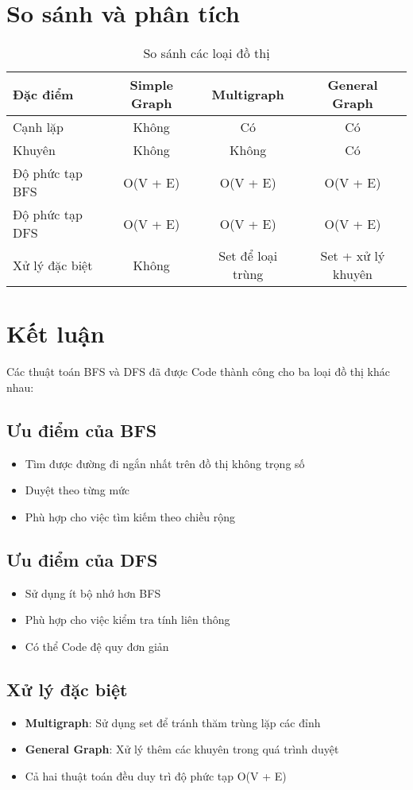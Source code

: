 \documentclass[12pt]{article}
\begin{document}
\section{So sánh và phân tích}

\begin{table}[h!]
\centering
\begin{tabular}{|l|c|c|c|}
\hline
\textbf{Đặc điểm} & \textbf{Simple Graph} & \textbf{Multigraph} & \textbf{General Graph} \\
\hline
Cạnh lặp & Không & Có & Có \\
\hline
Khuyên & Không & Không & Có \\
\hline
Độ phức tạp BFS & O(V + E) & O(V + E) & O(V + E) \\
\hline
Độ phức tạp DFS & O(V + E) & O(V + E) & O(V + E) \\
\hline
Xử lý đặc biệt & Không & Set để loại trùng & Set + xử lý khuyên \\
\hline
\end{tabular}
\caption{So sánh các loại đồ thị}
\end{table}
\section{Kết luận}
Các thuật toán BFS và DFS đã được Code thành công cho ba loại đồ thị khác nhau:
\subsection{Ưu điểm của BFS}
\begin{itemize}
\item Tìm được đường đi ngắn nhất trên đồ thị không trọng số
\item Duyệt theo từng mức
\item Phù hợp cho việc tìm kiếm theo chiều rộng
\end{itemize}
\subsection{Ưu điểm của DFS}
\begin{itemize}
\item Sử dụng ít bộ nhớ hơn BFS
\item Phù hợp cho việc kiểm tra tính liên thông
\item Có thể Code đệ quy đơn giản
\end{itemize}
\subsection{Xử lý đặc biệt}
\begin{itemize}
\item \textbf{Multigraph}: Sử dụng set để tránh thăm trùng lặp các đỉnh
\item \textbf{General Graph}: Xử lý thêm các khuyên trong quá trình duyệt
\item Cả hai thuật toán đều duy trì độ phức tạp O(V + E)
\end{itemize}
\end{document}
